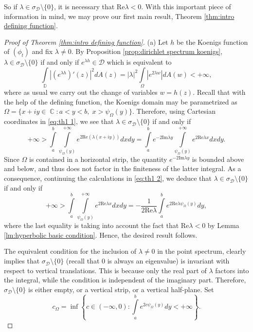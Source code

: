 \documentclass[11pt]{amsart}
\numberwithin{equation}{section}
\theoremstyle{definition}
\DeclareMathOperator{\C}{\mathbb{C}}
\DeclareMathOperator{\D}{\mathbb{D}}
\begin{document}
	So if $\lambda\in\sigma_\mathcal{D}\setminus\{0\}$, it is necessary that $\mathrm{Re}\lambda<0$. With this important piece of information in mind, we may prove our first main result, Theorem \ref{thm:intro defining function}.
	
	\begin{proof}[Proof of Theorem \ref{thm:intro defining function}]
		(a) Let $h$ be the Koenigs function of $(\phi_t)$ and fix $\lambda\ne0$. By Proposition \ref{prop:dirichlet spectrum koenigs}, $\lambda\in\sigma_\mathcal{D}\setminus\{0\}$ if and only if $e^{\lambda h}\in\mathcal{D}$ which is equivalent to
		\begin{equation}\label{eq:th1 1}
			\int\limits_{\D}\left|\left(e^{\lambda h}\right)'(z)\right|^2dA(z)=|\lambda|^2\int\limits_{\Omega}|e^{2\lambda w}|dA(w)<+\infty,
		\end{equation}
		where as usual we carry out the change of variables $w=h(z)$. Recall that with the help of the defining function, the Koenigs domain may be parametrized as $\Omega=\{x+iy\in\C:a<y<b, \; x>\psi_\Omega(y)\}$. Therefore, using Cartesian coordinates in \eqref{eq:th1 1}, we see that $\lambda\in\sigma_\mathcal{D}\setminus\{0\}$ if and only if
		\begin{equation}\label{eq:th1 2}
			+\infty>\int\limits_{a}^{b}\int\limits_{\psi_\Omega(y)}^{+\infty}e^{2\mathrm{Re}(\lambda(x+iy))}dxdy=\int\limits_{a}^{b}e^{-2\mathrm{Im}\lambda y}\int\limits_{\psi_\Omega(y)}^{+\infty}e^{2\mathrm{Re}\lambda x}dxdy.
		\end{equation}
		Since $\Omega$ is contained in a horizontal strip, the quantity $e^{-2\mathrm{Im}\lambda y}$ is bounded above and below, and thus does not factor in the finiteness of the latter integral. As a consequence, continuing the calculations in \eqref{eq:th1 2}, we deduce that $\lambda\in\sigma_\mathcal{D}\setminus\{0\}$ if and only if
		\begin{equation}
			+\infty>\int\limits_{a}^{b}\int\limits_{\psi_\Omega(y)}^{+\infty}e^{2\mathrm{Re}\lambda x}dxdy=-\frac{1}{2\mathrm{Re}\lambda}\int\limits_{a}^{b}e^{2\mathrm{Re}\lambda\psi_\Omega(y)}dy,
		\end{equation}
		where the last equality is taking into account the fact that $\mathrm{Re}\lambda<0$ by Lemma \ref{lm:hyperbolic basic condition}. Hence, the desired result follows.
		
		The equivalent condition for the inclusion of $\lambda\ne0$ in the point spectrum, clearly implies that $\sigma_\mathcal{D}\setminus\{0\}$ (recall that $0$ is always an eigenvalue) is invariant with respect to vertical translations. This is because only the real part of $\lambda$ factors into the integral, while the condition is independent of the imaginary part. Therefore, $\sigma_\mathcal{D}\setminus\{0\}$ is either empty, or a vertical strip, or a vertical half-plane. Set
		$$c_\Omega=\inf\left\{c\in(-\infty,0):\int\limits_{a}^{b}e^{2c\psi_\Omega(y)}dy<+\infty\right\}.$$
		

\end{proof}
\end{document}
